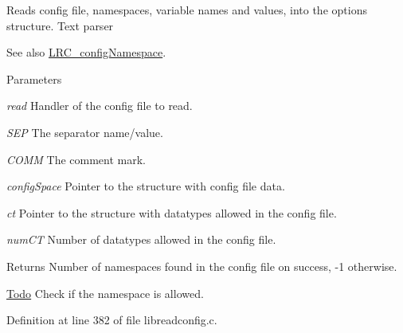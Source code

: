 Reads config file, namespaces, variable names and values, into the options structure. Text parser

\begin{DoxySeeAlso}{See also}
\hyperlink{struct_l_r_c__config_namespace}{LRC\_\-configNamespace}.
\end{DoxySeeAlso}

\begin{DoxyParams}{Parameters}
\item[{\em read}]Handler of the config file to read.\item[{\em SEP}]The separator name/value.\item[{\em COMM}]The comment mark.\item[{\em configSpace}]Pointer to the structure with config file data.\item[{\em ct}]Pointer to the structure with datatypes allowed in the config file.\item[{\em numCT}]Number of datatypes allowed in the config file.\end{DoxyParams}
\begin{DoxyReturn}{Returns}
Number of namespaces found in the config file on success, -\/1 otherwise.
\end{DoxyReturn}
\begin{Desc}
\item[\hyperlink{todo__todo000004}{Todo}]Check if the namespace is allowed. \end{Desc}


Definition at line 382 of file libreadconfig.c.